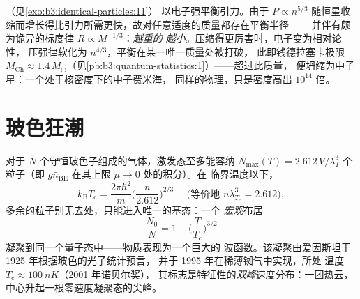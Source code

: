 \begin{example}[靠不相容性支撑的恒星]\label{ex:b3:quantum-statistics:dwarf}
（见\cref{exo:b3:identical-particles:11}）
以电子强平衡引力。由于 $P \propto
n^{5/3}$ 随恒星收缩而增长得比引力所需更快，故对任意适度的质量都存在平衡半径——
并伴有颇为诡异的标度律
$R \propto M^{-1/3}$：\emph{越重的
越小}。压缩得更厉害时，电子变为相对论性，
压强律软化为 $n^{4/3}$，平衡在某一唯一质量处被打破，
此即钱德拉塞卡极限 $M_{\text{Ch}} \approx
1.4\,M_\odot$（见\cref{pb:b3:quantum-statistics:1}）——超过此质量，
便坍缩为中子星：一个处于核密度下的中子费米海，
同样的物理，只是密度高出 $10^{14}$ 倍。
\end{example}

\section{玻色狂潮}

\begin{theorem}[玻色–爱因斯坦凝聚]\label{thm:b3:quantum-statistics:bec}
对于 $N$ 个守恒玻色子组成的气体，激发态至多能容纳
$N_{\max}(T) = 2.612\,V/\lambda_T^3$ 个粒子（即
$g\bar n_{\text{BE}}$ 在其上限 $\mu \to 0$ 处的积分）。在
临界温度以下，
\[
k_{\text{B}}T_{\text{c}} = \frac{2\pi\hbar^2}{m}
\Big(\frac{n}{2.612}\Big)^{2/3}
\quad\text{ (等价地 } n\lambda_{T_{\text{c}}}^3 = 2.612
\text{)} ,
\]
多余的粒子别无去处，只能进入唯一的基态：一个
\emph{宏观}布居
\[
\frac{N_0}{N} = 1 - \Big(\frac{T}{T_{\text{c}}}\Big)^{3/2}
\]
凝聚到同一个量子态中——物质表现为一个巨大的
波函数。该凝聚由爱因斯坦于 1925 年根据玻色的光子统计预言，
并于 1995 年在稀薄铷气中实现，所处
温度 $T_{\text{c}} \approx \qty{100}{nK}$（2001 年诺贝尔奖），
其标志是特征性的\emph{双峰}速度分布：一团热云，
中心升起一根零速度凝聚态的尖峰。
\end{theorem}
\admitted

